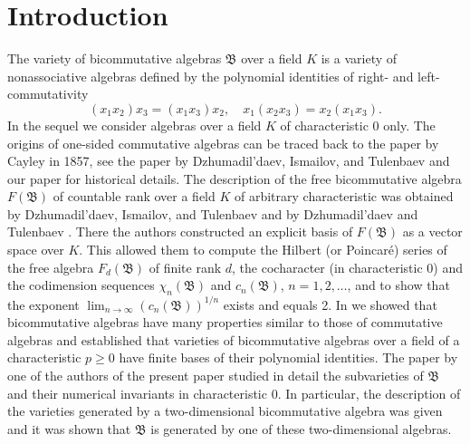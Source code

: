 \documentclass{amsart}
\theoremstyle{definition}
\begin{document}
\section{Introduction}
The variety of bicommutative algebras $\mathfrak B$ over a field $K$ is a variety of nonassociative algebras defined by the polynomial identities
of right- and left-commutativity
\[
(x_1x_2)x_3=(x_1x_3)x_2,\quad x_1(x_2x_3)=x_2(x_1x_3).
\]
In the sequel we consider algebras over a field $K$ of characteristic 0 only.
The origins of one-sided commutative algebras can be traced back to the paper by Cayley \cite{Ca} in 1857,
see the paper by Dzhumadil'daev, Ismailov, and Tulenbaev \cite{DIT} and our paper \cite{DrZ} for historical details.
The description of the free bicommutative algebra $F({\mathfrak B})$ of countable rank over a field $K$ of arbitrary characteristic
was obtained by Dzhumadil'daev, Ismailov, and Tulenbaev \cite{DIT} and by Dzhumadil'daev and Tulenbaev \cite{DT}.
There the authors constructed an explicit basis of $F({\mathfrak B})$ as a vector space over $K$.
This allowed them to compute the Hilbert (or Poincar\'e) series of the free algebra $F_d({\mathfrak B})$ of finite rank $d$,
the cocharacter (in characteristic 0) and the codimension sequences $\chi_n({\mathfrak B})$ and $c_n({\mathfrak B})$, $n=1,2,\ldots$,
and to show that the exponent $\lim_{n\to\infty}(c_n({\mathfrak B}))^{1/n}$ exists and equals 2.
In \cite{DrZ} we showed that bicommutative algebras have many properties similar to those of commutative algebras
and established that varieties of bicommutative algebras over a field of a characteristic $p\geq 0$ have finite bases of their polynomial identities.
The paper \cite{Dr3} by one of the authors of the present paper studied in detail the subvarieties of $\mathfrak B$ and their numerical invariants in characteristic 0.
In particular, the description of the varieties generated by a two-dimensional bicommutative algebra was given
and it was shown that $\mathfrak B$ is generated by one of these two-dimensional algebras.
\end{document}
